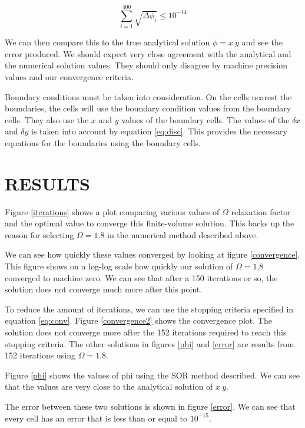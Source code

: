 \documentclass[cleanfoot,cleanhead,twocolumn,10pt,notitlepage]{asme2e}
\begin{document}
\begin{equation}
\sum_{i=1}^{400} \sqrt{\Delta \phi_i} \le 10^{-14}
\label{eq:conv}
\end{equation}

We can then compare this to the true analytical solution $\phi = x~y$ and see the error produced.  We should expect very close agreement with the analytical and the numerical solution values.  They should only disagree by machine precision values and our convergence criteria.

Boundary conditions must be taken into consideration.  On the cells nearest the boundaries, the cells will use the boundary condition values from the boundary cells.  They also use the $x$ and $y$  values of the boundary cells.  The values of the $\delta x$ and $\delta y$ is taken into account by equation \ref{eq:disc}.  This provides the necessary equations for the boundaries using the boundary cells.



\section*{RESULTS}

Figure \ref{iterations} shows a plot comparing various values of $\Omega$ relaxation factor and the optimal value to converge this finite-volume solution.  This backs up the reason for selecting $\Omega = 1.8$ in the numerical method described above.

We can see how quickly these values converged by looking at figure \ref{convergence}.  This figure shows on a log-log scale how quickly our solution of $\Omega=1.8$ converged to machine zero.  We can see that after a 150 iterations or so, the solution does not converge much more after this point.

To reduce the amount of iterations, we can use the stopping criteria specified in equation \ref{eq:conv}.  Figure \ref{convergence2} shows the convergence plot.  The solution does not converge  more after the 152 iterations required to reach this stopping criteria.  The other solutions in figures \ref{phi} and \ref{error} are results from 152 iterations using $\Omega = 1.8$.

Figure \ref{phi} shows the values of phi using the SOR method described.  We can see that the values are very close to the analytical solution of $x~y$.  

The error between these two solutions is shown in figure \ref{error}.  We can see that every cell has an error that is less than or equal to $10^{-15}$.
\end{document}
